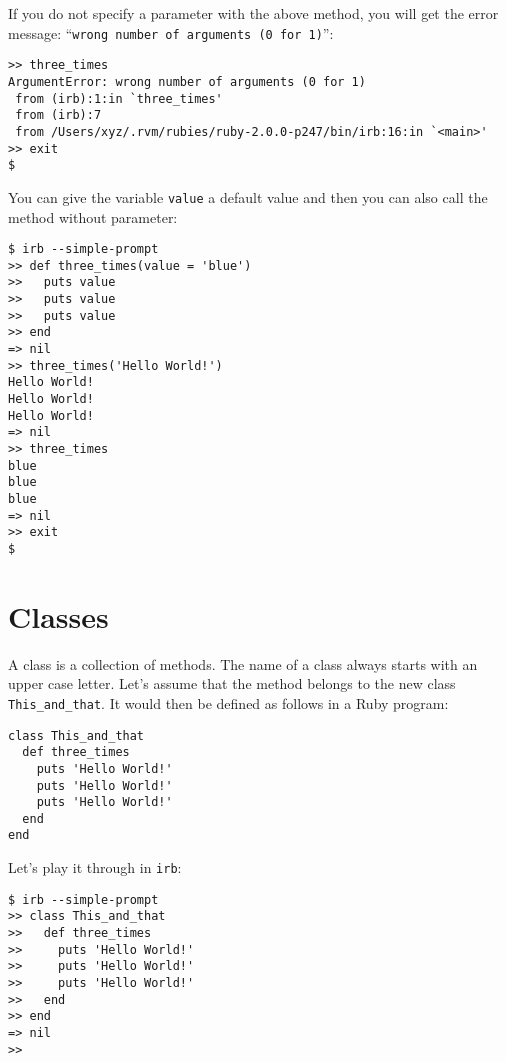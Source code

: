 \documentclass[a4paper]{book}
\begin{document}
If you do not specify a parameter with the above method, you will get the error message: “\texttt{wrong number of arguments (0 for       1)}”:

\begin{shaded}\begin{verbatim}
>> three_times
ArgumentError: wrong number of arguments (0 for 1)
 from (irb):1:in `three_times'
 from (irb):7
 from /Users/xyz/.rvm/rubies/ruby-2.0.0-p247/bin/irb:16:in `<main>'
>> exit
$
\end{verbatim}\end{shaded}

You can give the variable \texttt{value} a default value and then you can also call the method without parameter:

\begin{shaded}\begin{verbatim}
$ irb --simple-prompt
>> def three_times(value = 'blue')
>>   puts value
>>   puts value
>>   puts value
>> end
=> nil
>> three_times('Hello World!')
Hello World!
Hello World!
Hello World!
=> nil
>> three_times
blue
blue
blue
=> nil
>> exit
$
\end{verbatim}\end{shaded}

\section{Classes}\label{classes}

A class is a collection of methods. The name of a class always starts with an upper case letter. Let's assume that the method belongs to the new class \texttt{This\_and\_that}. It would then be defined as follows in a Ruby program:

\begin{shaded}\begin{verbatim}
class This_and_that
  def three_times
    puts 'Hello World!'
    puts 'Hello World!'
    puts 'Hello World!'
  end
end
\end{verbatim}\end{shaded}

Let's play it through in \texttt{irb}:

\begin{shaded}\begin{verbatim}
$ irb --simple-prompt
>> class This_and_that
>>   def three_times
>>     puts 'Hello World!'
>>     puts 'Hello World!'
>>     puts 'Hello World!'
>>   end
>> end
=> nil
>>
\end{verbatim}\end{shaded}
\end{document}
